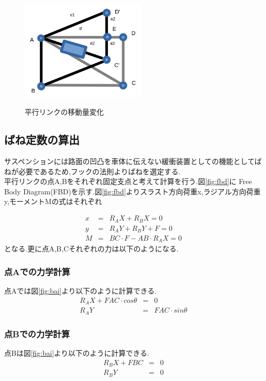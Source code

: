 \documentclass[12pt,oneside]{sotsuken_paper}
\begin{document}
\begin{figure}[htp]
 \begin{center}
  \includegraphics[width=60mm]{img/hard/fig6.png}
 　\caption{平行リンクの移動量変化}
  \label{fig:rink}%
 \end{center}
\end{figure}

\subsection{ばね定数の算出}
サスペンションには路面の凹凸を車体に伝えない緩衝装置としての機能としてばねが必要であるため,フックの法則よりばねを選定する.　\\
平行リンクの点A,Bをそれぞれ固定支点と考えて計算を行う.図\ref{fig:fbd}に Free Body Diagram(FBD)を示す.図\ref{fig:fbd}よりスラスト方向荷重x,ラジアル方向荷重y,モーメントMの式はそれぞれ

\begin{eqnarray}
	x & = & R_AX+R_BX=0 \\
	y & = & R_AY+R_BY+F=0 \\
	M & = & BC\cdot F-AB\cdot R_AX=0
\end{eqnarray}
となる.更に点A,B,Cそれぞれの力は以下のようになる.

\subsubsection{点Aでの力学計算}
点Aでは図\ref{fig:bai}より以下のように計算できる.
\begin{eqnarray}
	R_AX+FAC\cdot cosθ & = & 0 \\
	R_AY & = & FAC\cdot sinθ 
\end{eqnarray}
\subsubsection{点Bでの力学計算}
点Bは図\ref{fig:bai}より以下のように計算できる.
\begin{eqnarray}
	R_BX+FBC & = & 0 \\
	R_BY & = & 0
\end{eqnarray}
\end{document}
